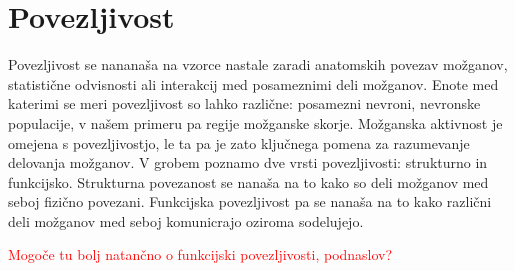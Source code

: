 \section{Povezljivost}
Povezljivost se nananaša na vzorce nastale zaradi anatomskih povezav možganov, statistične odvisnosti ali interakcij med posameznimi deli možganov.  Enote med katerimi se meri povezljivost so lahko različne: posamezni nevroni, nevronske populacije, v našem primeru pa regije možganske skorje. Možganska aktivnost je omejena s povezljivostjo, le ta pa je zato ključnega pomena za razumevanje delovanja možganov. V grobem poznamo dve vrsti povezljivosti: strukturno in funkcijsko. Strukturna povezanost se nanaša na to kako so deli možganov med seboj fizično povezani. Funkcijska povezljivost pa se nanaša na to kako različni deli možganov med seboj komunicrajo oziroma sodelujejo.\cite{sporns_brain_2007}

\textcolor{red}{Mogoče tu bolj natančno o funkcijski povezljivosti, podnaslov?}
